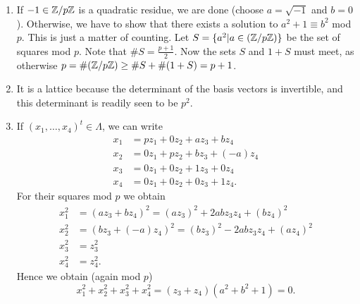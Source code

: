 \documentclass[a4paper,11pt]{article}
\begin{document}
\begin{enumerate}[wide,labelindent=0pt]
    \item If $-1 \in \mathbb{Z}/p\mathbb{Z}$ is a quadratic residue, we are done (choose
        $a = \sqrt{-1}$ and $b=0$). Otherwise, we have to show that there 
        exists a solution to $a^2 +1 \equiv b^2$ mod $p$. This is just a matter
        of counting. Let $S = \{a^2 | a \in (\mathbb{Z}/p\mathbb{Z})\}$ be the set of squares
        mod $p$. Note that $\# S = \frac{p+1}2$. Now the sets $S$ and $1+S$ must meet,
        as otherwise $p = \# (\mathbb{Z}/p\mathbb{Z}) \geq \# S + \#(1+S) = p+1$.
    \item It is a lattice because the determinant of the basis vectors is invertible,
        and this determinant is readily seen to be $p^2$. 
    \item If $(x_1, \dots, x_4)^t \in \Lambda$, we can write
        \begin{equation*}
            \begin{aligned}
                x_1 &= pz_1 + 0 z_2 + a z_3 + b z_4\\
                x_2 &= 0z_1 + p z_2 + b z_3 + (-a) z_4\\
                x_3 &= 0z_1 + 0 z_2 + 1 z_3 + 0 z_4\\
                x_4 &= 0z_1 + 0 z_2 + 0 z_3 + 1 z_4.
            \end{aligned}
        \end{equation*}
        For their squares mod $p$ we obtain
        \begin{equation*}
            \begin{aligned}
                x_1^2 &= (a z_3 + b z_4)^2 = (az_3)^2 + 2abz_3 z_4 + (bz_4)^2\\
                x_2^2 &= (b z_3 + (-a) z_4)^2 = (bz_3)^2 - 2abz_3z_4 + (az_4)^2\\
                x_3^2 &= z_3^2\\
                x_4^2 &= z_4^2.
            \end{aligned}
        \end{equation*}
        Hence we obtain (again mod $p$)
        \begin{equation*}
            x_1^2 + x_2^2 + x_3^2 + x_4^2 = (z_3+z_4)(a^2 + b^2 + 1) = 0.
        \end{equation*}


\end{enumerate}
\end{document}
